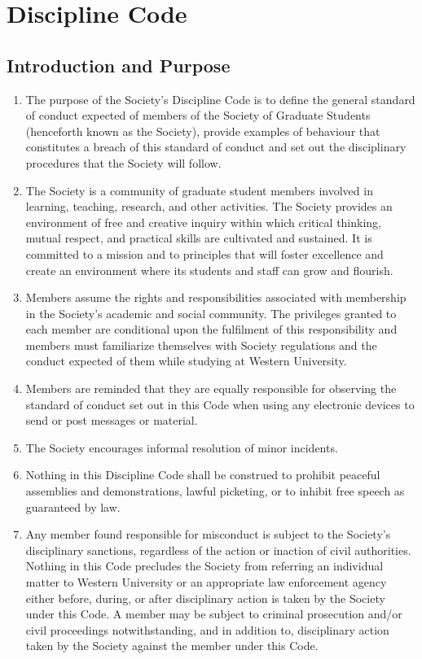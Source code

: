 \section{Discipline Code}

\subsection{Introduction and Purpose}
\begin{enumerate} [align=left]
\item  The purpose of the Society's Discipline Code is to define the general standard of conduct expected of members of the Society of Graduate Students (henceforth known as the Society), provide examples of behaviour that constitutes a breach of this standard of conduct and set out the disciplinary procedures that the Society will follow.
\item The Society is a community of graduate student members involved in learning, teaching, research, and other activities. The Society provides an environment of free and creative inquiry within which critical thinking, mutual respect, and practical skills are cultivated and sustained. It is committed to a mission and to principles that will foster excellence and create an environment where its students and staff can grow and flourish.
\item Members assume the rights and responsibilities associated with membership in the Society's academic and social community. The privileges granted to each member are conditional upon the fulfilment of this responsibility and members must familiarize themselves with Society regulations and the conduct expected of them while studying at Western University.
\item Members are reminded that they are equally responsible for observing the standard of conduct set out in this Code when using any electronic devices to send or post messages or material.
\item The Society encourages informal resolution of minor incidents.
\item Nothing in this Discipline Code shall be construed to prohibit peaceful assemblies and demonstrations, lawful picketing, or to inhibit free speech as guaranteed by law.
\item Any member found responsible for misconduct is subject to the Society's disciplinary sanctions, regardless of the action or inaction of civil authorities. Nothing in this Code precludes the Society from referring an individual matter to Western University or an appropriate law enforcement agency either before, during, or after disciplinary action is taken by the Society under this Code. A member may be subject to criminal prosecution and/or civil proceedings notwithstanding, and in addition to, disciplinary action taken by the Society against the member under this Code.
\end{enumerate}

